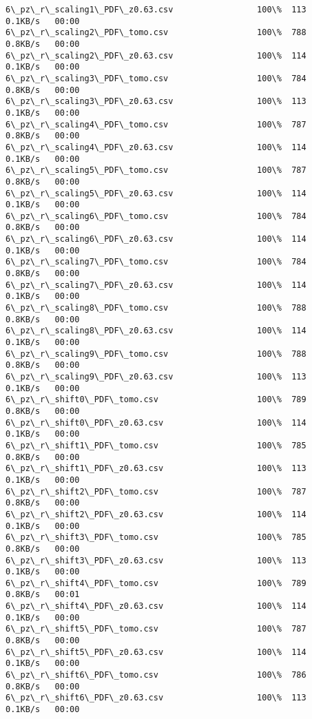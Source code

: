 \documentclass[11pt]{article}
\begin{document}
\begin{Verbatim}[commandchars=\\\{\}]
6\_pz\_r\_scaling1\_PDF\_z0.63.csv                 100\%  113     0.1KB/s   00:00    
6\_pz\_r\_scaling2\_PDF\_tomo.csv                  100\%  788     0.8KB/s   00:00    
6\_pz\_r\_scaling2\_PDF\_z0.63.csv                 100\%  114     0.1KB/s   00:00    
6\_pz\_r\_scaling3\_PDF\_tomo.csv                  100\%  784     0.8KB/s   00:00    
6\_pz\_r\_scaling3\_PDF\_z0.63.csv                 100\%  113     0.1KB/s   00:00    
6\_pz\_r\_scaling4\_PDF\_tomo.csv                  100\%  787     0.8KB/s   00:00    
6\_pz\_r\_scaling4\_PDF\_z0.63.csv                 100\%  114     0.1KB/s   00:00    
6\_pz\_r\_scaling5\_PDF\_tomo.csv                  100\%  787     0.8KB/s   00:00    
6\_pz\_r\_scaling5\_PDF\_z0.63.csv                 100\%  114     0.1KB/s   00:00    
6\_pz\_r\_scaling6\_PDF\_tomo.csv                  100\%  784     0.8KB/s   00:00    
6\_pz\_r\_scaling6\_PDF\_z0.63.csv                 100\%  114     0.1KB/s   00:00    
6\_pz\_r\_scaling7\_PDF\_tomo.csv                  100\%  784     0.8KB/s   00:00    
6\_pz\_r\_scaling7\_PDF\_z0.63.csv                 100\%  114     0.1KB/s   00:00    
6\_pz\_r\_scaling8\_PDF\_tomo.csv                  100\%  788     0.8KB/s   00:00    
6\_pz\_r\_scaling8\_PDF\_z0.63.csv                 100\%  114     0.1KB/s   00:00    
6\_pz\_r\_scaling9\_PDF\_tomo.csv                  100\%  788     0.8KB/s   00:00    
6\_pz\_r\_scaling9\_PDF\_z0.63.csv                 100\%  113     0.1KB/s   00:00    
6\_pz\_r\_shift0\_PDF\_tomo.csv                    100\%  789     0.8KB/s   00:00    
6\_pz\_r\_shift0\_PDF\_z0.63.csv                   100\%  114     0.1KB/s   00:00    
6\_pz\_r\_shift1\_PDF\_tomo.csv                    100\%  785     0.8KB/s   00:00    
6\_pz\_r\_shift1\_PDF\_z0.63.csv                   100\%  113     0.1KB/s   00:00    
6\_pz\_r\_shift2\_PDF\_tomo.csv                    100\%  787     0.8KB/s   00:00    
6\_pz\_r\_shift2\_PDF\_z0.63.csv                   100\%  114     0.1KB/s   00:00    
6\_pz\_r\_shift3\_PDF\_tomo.csv                    100\%  785     0.8KB/s   00:00    
6\_pz\_r\_shift3\_PDF\_z0.63.csv                   100\%  113     0.1KB/s   00:00    
6\_pz\_r\_shift4\_PDF\_tomo.csv                    100\%  789     0.8KB/s   00:01    
6\_pz\_r\_shift4\_PDF\_z0.63.csv                   100\%  114     0.1KB/s   00:00    
6\_pz\_r\_shift5\_PDF\_tomo.csv                    100\%  787     0.8KB/s   00:00    
6\_pz\_r\_shift5\_PDF\_z0.63.csv                   100\%  114     0.1KB/s   00:00    
6\_pz\_r\_shift6\_PDF\_tomo.csv                    100\%  786     0.8KB/s   00:00    
6\_pz\_r\_shift6\_PDF\_z0.63.csv                   100\%  113     0.1KB/s   00:00    

\end{Verbatim}
\end{document}
